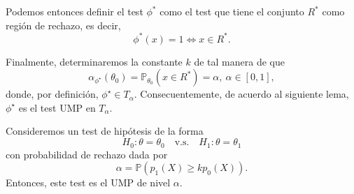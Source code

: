Podemos entonces definir el test $\phi^*$ como el test que tiene el conjunto $R^*$ como región de rechazo, es decir, 
\begin{equation}
	\phi^*(x) = 1 \Leftrightarrow x\in R^*.
\end{equation}

Finalmente, determinaremos la constante $k$ de tal manera de que 
\begin{equation}
	\alpha_{\phi^\star}(\theta_0) = \mathbb{P}_{\theta_0}(x\in R^*) = \alpha,\ \alpha\in[0,1], 
\end{equation}
donde, por definición, $\phi^\star\in T_\alpha$. Consecuentemente, de acuerdo al siguiente lema, $\phi^\star$ es el test UMP en $T_\alpha$.

\begin{lemma}
	Consideremos un test de hipótesis de la forma 
	\begin{equation}
		H_0:\theta =\theta_0\quad \text{v.s.}\quad H_1:\theta = \theta_1
	\end{equation}
	con probabilidad de rechazo dada por
	\begin{equation}
			\alpha = \mathbb{P}(p_1(X)\geq k p_0(X)).
		\end{equation}
	Entonces, este test es el UMP de nivel $\alpha$.
\end{lemma}

